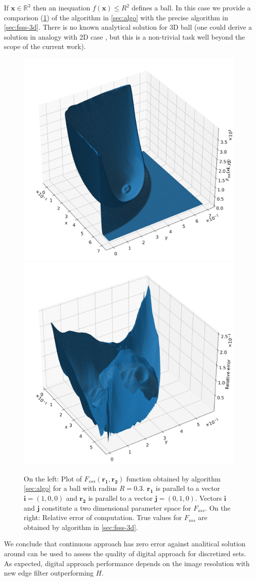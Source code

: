 \documentclass[reprint,amsmath,amssymb,aps,pre,showkeys,showpacs]{revtex4-1}
\begin{document}
If $\bm{x} \in \mathbb{R}^3$ then an inequation $f(\bm{x}) \le R^2$ defines a
ball. In this case we provide a comparison (\cref{fig:fsss-ball}) of the
algorithm in \cref{sec:algo} with the precise algorithm in
\cref{sec:fsss-3d}. There is no known analytical solution for 3D ball (one could
derive a solution in analogy with 2D case \cite{Torquato_book}, but this is a
non-trivial task well beyond the scope of the current work).
\begin{figure}[!hpt]
  \centering
  \includegraphics[width=0.45\linewidth]{images/ball-sss.png}
  \hfill
  \includegraphics[width=0.45\linewidth]{images/ball-sss-error.png}
  \caption[]{On the left: Plot of $F_{sss}(\bm{r_1}, \bm{r_2})$ function
    obtained by algorithm \cref{sec:algo} for a ball with radius
    $R = 0.3$. $\bm{r_1}$ is parallel to a vector $\bm{i} = (1, 0, 0)$ and
    $\bm{r_2}$ is parallel to a vector $\bm{j} = (0, 1, 0)$. Vectors $\bm{i}$
    and $\bm{j}$ constitute a two dimensional parameter space for $F_{sss}$. On
    the right: Relative error of computation. True values for $F_{sss}$ are
    obtained by algorithm in \cref{sec:fsss-3d}.}
  \label{fig:fsss-ball}
\end{figure}

We conclude that continuous approach has zero error against analitical solution
around can be used to assess the quality of digital approach for discretized
sets. As expected, digital approach performance depends on the image resolution
with new edge filter outperforming $H$.
\end{document}

